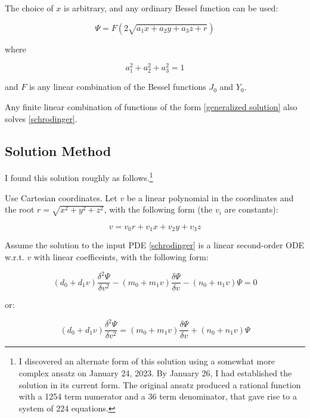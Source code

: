 \documentclass{article}
\begin{document}
The choice of $x$ is arbitrary, and any ordinary Bessel function can be used:

\begin{equation}
\label{generalized solution}
\Psi = F(2\sqrt{a_1 x+ a_2 y+ a_3 z+r})
\end{equation}

where

\begin{equation*}
a_1^2+a_2^2+a_3^2=1
\end{equation*}

and $F$ is any linear combination of the Bessel functions $J_0$ and $Y_0$.

\vskip 12pt

Any finite linear combination of functions of the form \eqref{generalized solution} also solves \eqref{schrodinger}.

\subsection*{Solution Method}


I found this solution roughly as follows.\footnote{
I discovered an alternate form of this solution using a somewhat more complex ansatz
on January 24, 2023.  By January 26, I had established the solution in its current form.
The original ansatz produced a rational function with
a 1254 term numerator and a 36 term denominator, that gave rise to a system of 224 equations.
}

Use Cartesian coordinates.  Let $v$ be a linear polynomial in the coordinates and the root $r=\sqrt{x^2+y^2+z^2}$,
with the following form (the $v_i$ are constants):

\begin{equation}
\label{v ansatz}
v = v_0 r + v_1 x + v_2 y + v_3 z
\end{equation}

Assume the solution to the input PDE \eqref{schrodinger}
is a linear second-order ODE w.r.t. $v$ with linear coefficeints,
with the following form:

\begin{equation}
\label{psi ansatz}
(d_0 + d_1 v) \frac{\delta^2\Psi}{\delta v^2} - (m_0 + m_1 v) \frac{\delta\Psi}{\delta v} - (n_0 + n_1 v) \Psi = 0
\end{equation}

or:

\begin{equation}
\label{psi ansatz sub}
(d_0 + d_1 v) \frac{\delta^2\Psi}{\delta v^2} = (m_0 + m_1 v) \frac{\delta\Psi}{\delta v} + (n_0 + n_1 v) \Psi
\end{equation}
\end{document}
